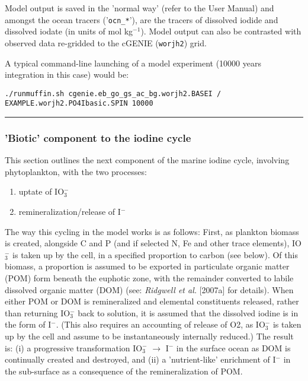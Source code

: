 \documentclass[11pt,fleqn]{book} %
\begin{document}
Model output is saved in the 'normal way' (refer to the User Manual) and amongst the ocean tracers ('\texttt{ocn\_*}'), are the tracers of dissolved iodide and dissolved iodate (in units of mol kg\(^{-1}\)). Model output can also be contrasted with observed data re-gridded to the cGENIE (\texttt{worjh2}) grid.

\noindent A typical command-line launching of a model experiment (10000 years integration in this case) would be:
\vspace{-1mm}\begin{verbatim}./runmuffin.sh cgenie.eb_go_gs_ac_bg.worjh2.BASEI /
EXAMPLE.worjh2.PO4Ibasic.SPIN 10000\end{verbatim}\vspace{-1mm}

%
\noindent\rule{4cm}{0.5pt}
\subsubsection{'Biotic' component to the iodine cycle}
\vspace{1mm}

This section outlines the next component of the marine iodine cycle, involving phytoplankton, with the two processes:
\begin{enumerate}[noitemsep]
\vspace{1mm}
\item uptate of IO\(^{-}_{3}\)
\vspace{1mm}
\item  remineralization/release of I\(^{-}\)
\end{enumerate}

\noindent The way this cycling in the model works is as follows: First, as plankton biomass is created, alongside C and P (and if selected N, Fe and other trace elements), IO\(^{-}_{3}\) is taken up by the cell, in a specified proportion to carbon (see below). Of this biomass, a proportion is assumed to be exported in particulate organic matter (POM) form beneath the euphotic zone, with the remainder converted to labile dissolved organic matter (DOM) (see: \textit{Ridgwell et al.} [2007a] for details). When either POM or DOM is remineralized and elemental constituents released, rather than returning IO\(^{-}_{3}\) back to solution, it is assumed that the dissolved iodine is in the form of I\(^{-}\). (This also requires an accounting of release of O2, as IO\(^{-}_{3}\) is taken up by the cell and assume to be instantaneously internally reduced.) The result is: (i) a progressive transformation IO\(^{-}_{3}\) \(\rightarrow\) I\(^{-}\) in the surface ocean as DOM is continually created and destroyed, and (ii) a 'nutrient-like' enrichment of I\(^{-}\) in the sub-surface as a consequence of the remineralization of POM.
\end{document}
